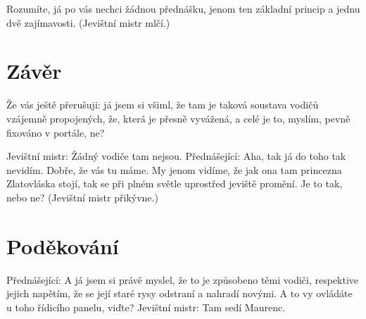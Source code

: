 \documentclass{cygclanek}
\begin{document}
Rozumíte, já po vás nechci žádnou přednášku, jenom ten základní princip a jednu dvě zajímavosti. (Jevištní mistr mlčí.)
\section{Závěr}
Že vás ještě přerušuji: já jsem si všiml, že tam je taková soustava vodičů vzájemně propojených, že, která je přesně vyvážená, a celé je to, myslím, pevně fixováno v portále, ne?

Jevištní mistr: Žádný vodiče tam nejsou. Přednášející: Aha, tak já do toho tak nevidím. Dobře, že vás tu máme. My jenom vidíme, že jak ona tam princezna Zlatovláska stojí, tak se při plném světle uprostřed jeviště promění. Je to tak, nebo ne? (Jevištní mistr přikývne.)
\section*{Poděkování}
Přednášející: A já jsem si právě myslel, že to je způsobeno těmi vodiči, respektive jejich napětím, že se její staré rysy odstraní a nahradí novými. A to vy ovládáte u toho řídicího panelu, viďte? Jevištní mistr: Tam sedí Maurenc.



\printbibliography[heading=bibintoc,title={Literatura}]

% 
% 
\end{document}
